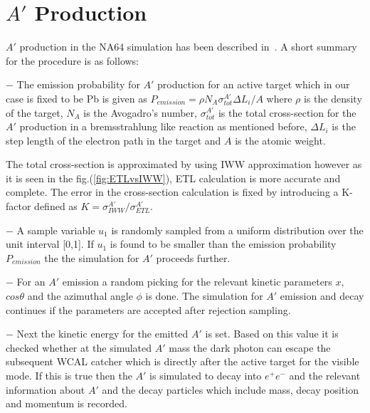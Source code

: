 \section{$A'$ Production}
$A'$ production in the NA64 simulation has been described in~\cite{Gninenko:2017yus}. A short summary for the procedure is as follows:
\begin{description}
  \item $-$ The emission probability for $A'$ production for an active target which in our case is fixed to be Pb is given as $P_{emission} = \rho N_A \sigma_{tot}^{A'} \Delta L_i / A $ where $\rho$ is the density of the target, $N_A$ is the Avogadro's number, $\sigma_{tot}^{A'}$ is the total cross-section for the $A'$ production in a bremsstrahlung like reaction as mentioned before, $\Delta L_i$ is the step length of the electron path in the target and $A$ is the atomic weight.

  The total cross-section is approximated by using IWW approximation however as it is seen in the fig.(\ref{fig:ETLvsIWW}), ETL calculation is more accurate and complete. The error in the cross-section calculation is fixed by introducing a K-factor defined as $K = \sigma_{IWW}^{A'} / \sigma_{ETL}^{A'}$.

  \item $-$ A sample variable $u_1$ is randomly sampled from a uniform distribution over the unit interval [0,1]. If $u_1$ is found to be smaller than the emission probability $P_{emission}$ the the simulation for $A'$ proceeds further.

  \item $-$ For an $A'$ emission a random picking for the relevant kinetic parameters $x$, $cos\theta$ and the azimuthal angle $\phi$ is done. The simulation for $A'$ emission and decay continues if the parameters are accepted after rejection sampling.

  \item $-$ Next the kinetic energy for the emitted $A'$ is set. Based on this value it is checked whether at the simulated $A'$ mass the dark photon can escape the subsequent WCAL catcher which is directly after the active target for the visible mode. If this is true then the $A'$ is simulated to decay into $e^+e^-$ and the relevant information about $A'$ and the decay particles which include mass, decay position and momentum is recorded.
\end{description}

